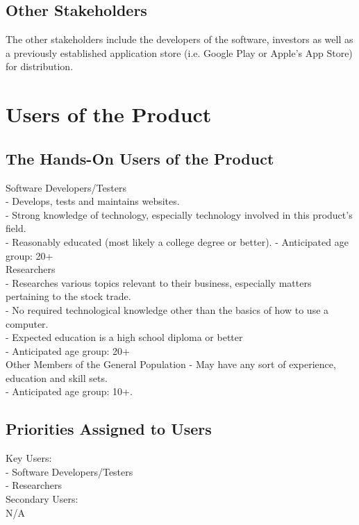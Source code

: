 \documentclass[titlepage]{article}
\begin{document}
\subsection*{Other Stakeholders}
The other stakeholders include the developers of the software, investors as well as a previously established application store (i.e. Google Play or Apple’s App Store) for distribution.

\section{Users of the Product}

\subsection*{The Hands-On Users of the Product}
Software Developers/Testers\\
- Develops, tests and maintains websites.\\
- Strong knowledge of technology, especially technology involved in this product’s field.\\
- Reasonably educated (most likely a college degree or better).
- Anticipated age group: 20+\\

Researchers\\
- Researches various topics relevant to their business, especially matters pertaining to the stock trade.\\
- No required technological knowledge other than the basics of how to use a computer.\\
- Expected education is a high school diploma or better\\
- Anticipated age group: 20+\\

Other Members of the General Population
- May have any sort of experience, education and skill sets.\\
- Anticipated age group: 10+.\\


\subsection*{Priorities Assigned to Users}
Key Users:\\
- Software Developers/Testers\\
- Researchers\\

Secondary Users:\\
N/A\\
\end{document}
